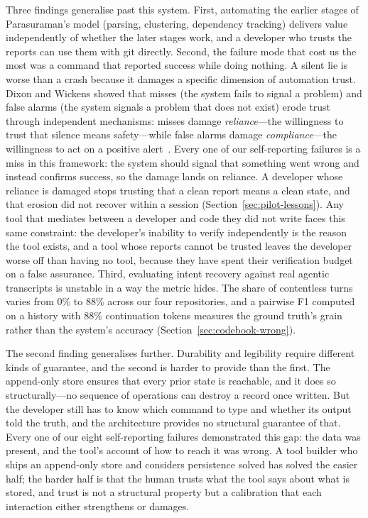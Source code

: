 Three findings generalise past this system. First, automating the earlier
stages of Parasuraman's model (parsing, clustering, dependency tracking)
delivers value independently of whether the later stages work, and a developer
who trusts the reports can use them with git directly. Second, the failure mode
that cost us the most was a command that reported success while doing nothing.
A silent lie is worse than a crash because it damages a specific dimension of
automation trust. Dixon and Wickens showed that misses (the system fails to
signal a problem) and false alarms (the system signals a problem that does not
exist) erode trust through independent mechanisms: misses damage
\emph{reliance}---the willingness to trust that silence means safety---while
false alarms damage \emph{compliance}---the willingness to act on a positive
alert~\cite{dixon2007}. Every one of our self-reporting failures is a miss in
this framework: the system should signal that something went wrong and instead
confirms success, so the damage lands on reliance. A developer whose reliance
is damaged stops trusting that a clean report means a clean state, and that
erosion did not recover within a session
(Section~\ref{sec:pilot-lessons}). Any tool that mediates
between a developer and code they did not write faces this same constraint: the
developer's inability to verify independently is the reason the tool exists, and
a tool whose reports cannot be trusted leaves the developer worse off than
having no tool, because they have spent their verification budget on a false
assurance. Third, evaluating intent
recovery against real agentic transcripts is unstable in a way the metric hides.
The share of contentless turns varies from 0\% to 88\% across our four
repositories, and a pairwise F1 computed on a history with 88\% continuation
tokens measures the ground truth's grain rather than the system's accuracy
(Section~\ref{sec:codebook-wrong}).

The second finding generalises further. Durability and legibility require
different kinds of guarantee, and the second is harder to provide than the
first. The append-only store ensures that every prior state is reachable, and it
does so structurally---no sequence of operations can destroy a record once
written. But the developer still has to know which command to type and whether
its output told the truth, and the architecture provides no structural guarantee
of that. Every one of our eight self-reporting failures demonstrated this gap:
the data was present, and the tool's account of how to reach it was wrong. A
tool builder who ships an append-only store and considers persistence solved has
solved the easier half; the harder half is that the human trusts what the tool
says about what is stored, and trust is not a structural property but a
calibration that each interaction either strengthens or damages.

